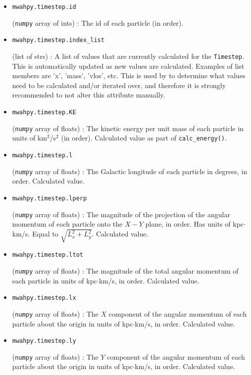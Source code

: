 \documentclass{article}
\begin{document}
\begin{itemize}
\item \verb!mwahpy.timestep.id!

(\verb!numpy! array of ints) : The id of each particle (in order). 

\item \verb!mwahpy.timestep.index_list!

(list of strs) : A list of values that are currently calculated for the \verb!Timestep!. This is automatically updated as new values are calculated. Examples of list members are 'x', 'mass', 'vlos', etc. This is used by \mwahpy to determine what values need to be calculated and/or iterated over, and therefore it is strongly recommended to not alter this attribute manually.

\item \verb!mwahpy.timestep.KE!

(\verb!numpy! array of floats) : The kinetic energy per unit mass of each particle in units of km$^2$/s$^2$ (in order). Calculated value as part of \verb!calc_energy()!. 

\item \verb!mwahpy.timestep.l!

(\verb!numpy! array of floats) : The Galactic longitude of each particle in degrees, in order. Calculated value.

\item \verb!mwahpy.timestep.lperp!

(\verb!numpy! array of floats) : The magnitude of the projection of the angular momentum of each particle onto the $X-Y$ plane, in order. Has units of kpc$\cdot$km/s. Equal to $\sqrt{L_x^2 + L_y^2}.$ Calculated value.

\item \verb!mwahpy.timestep.ltot!

(\verb!numpy! array of floats) : The magnitude of the total angular momentum of each particle in units of kpc$\cdot$km/s, in order. Calculated value.

\item \verb!mwahpy.timestep.lx!

(\verb!numpy! array of floats) : The $X$ component of the angular momentum of each particle about the origin in units of kpc$\cdot$km/s, in order. Calculated value.

\item \verb!mwahpy.timestep.ly!

(\verb!numpy! array of floats) : The $Y$ component of the angular momentum of each particle about the origin in units of kpc$\cdot$km/s, in order. Calculated value.


\end{itemize}
\end{document}
